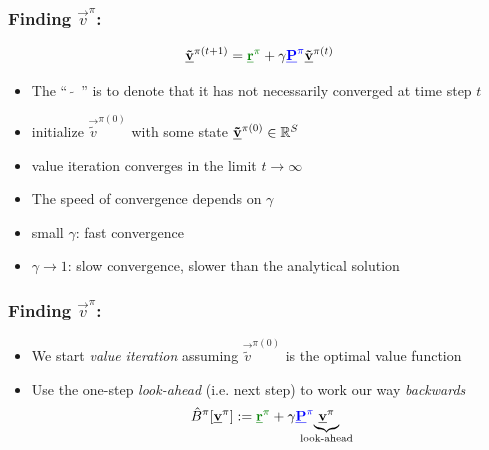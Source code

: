 \begin{frame}\frametitle{Finding $\vec v^\pi$:~\subsubsecname}

\begin{equation}
	\vec {\tilde v}^{\pi (t+1)} = {\color{reward}\vec r^\pi} 
		+ \gamma {\color{trans}\vec P^\pi} \vec {\tilde v}^{\pi (t)} 
\end{equation}

\begin{itemize}
\item 
The ``~$\tilde{}$~'' is to denote that it has not necessarily converged 
at time step $t$
\item initialize $\vec {\tilde v}^{\pi (0)}$ with some state $\underline{\mathbf{\tilde v}}^{\pi (0)} \in \mathbb{R}^{S}$
\item value iteration converges in the limit $t \rightarrow \infty$
\item The speed of convergence depends on $\gamma$
\end{itemize}


\pause 

\begin{itemize}
\item small $\gamma$: fast convergence
\item $\gamma \rightarrow 1$: slow convergence, slower than the analytical solution
\end{itemize}

\end{frame}


\begin{frame}\frametitle{Finding $\vec v^\pi$:~\subsubsecname}
    

\begin{itemize}
\item We start \emph{value iteration} assuming $\vec {\tilde v}^{\pi (0)}$ is the optimal value function
\item Use the one-step \emph{look-ahead} (i.e. next step) to work our way \emph{backwards}\\

	\begin{equation*}
		\hat B^\pi[\vec v^\pi] :=
		{\color{reward}\vec r^\pi} 
			+ \gamma {\color{trans}\vec P^\pi} \kern-2.7ex \underbrace{\vec v^\pi}_{\text{look-ahead}}
	\end{equation*}
\end{itemize}

\end{frame}

